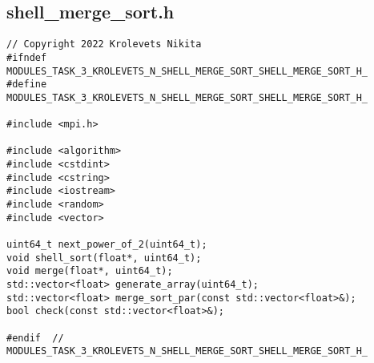 \documentclass[14pt, a4paper]{extarticle}
\begin{document}
	\subsection{shell\_merge\_sort.h}
	\begin{lstlisting}
// Copyright 2022 Krolevets Nikita
#ifndef MODULES_TASK_3_KROLEVETS_N_SHELL_MERGE_SORT_SHELL_MERGE_SORT_H_
#define MODULES_TASK_3_KROLEVETS_N_SHELL_MERGE_SORT_SHELL_MERGE_SORT_H_

#include <mpi.h>

#include <algorithm>
#include <cstdint>
#include <cstring>
#include <iostream>
#include <random>
#include <vector>

uint64_t next_power_of_2(uint64_t);
void shell_sort(float*, uint64_t);
void merge(float*, uint64_t);
std::vector<float> generate_array(uint64_t);
std::vector<float> merge_sort_par(const std::vector<float>&);
bool check(const std::vector<float>&);

#endif  // MODULES_TASK_3_KROLEVETS_N_SHELL_MERGE_SORT_SHELL_MERGE_SORT_H_

	\end{lstlisting}
	\newpage
\end{document}
